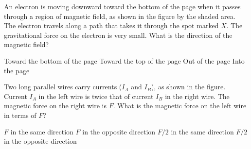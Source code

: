 \documentclass{../../../oss-ap12ibhl}
\begin{document}
\genheader
{}

\begin{questions}
  \question An electron is moving downward toward the bottom of the page when
  it passes through a region of magnetic field, as shown in the figure by the
  shaded area. The electron travels along a path that takes it through the spot
  marked $X$. The gravitational force on the electron is very small. What is
  the direction of the magnetic field?

  \begin{minipage}{.2\linewidth}
  \end{minipage}
  \begin{minipage}{.4\linewidth}
    \begin{choices}
      \choice Toward the bottom of the page
      \choice Toward the top of the page
      \choice Out of the page
      \choice Into the page
    \end{choices}
  \end{minipage}

    
  \question Two long parallel wires carry currents ($I_A$ and $I_B$), as shown
  in the figure. Current $I_A$ in the left wire is twice that of current $I_B$
  in the right wire. The magnetic force on the right wire is $F$. What is the
  magnetic force on the left wire in terms of $F$?

  \begin{minipage}{.2\linewidth}
  \end{minipage}
  \begin{minipage}{.4\linewidth}
    \begin{choices}
      \choice $F$ in the same direction
      \choice $F$ in the opposite direction
      \choice $F/2$ in the same direction
      \choice $F/2$ in the opposite direction
    \end{choices}
  \end{minipage}
  

\end{questions}
\end{document}
